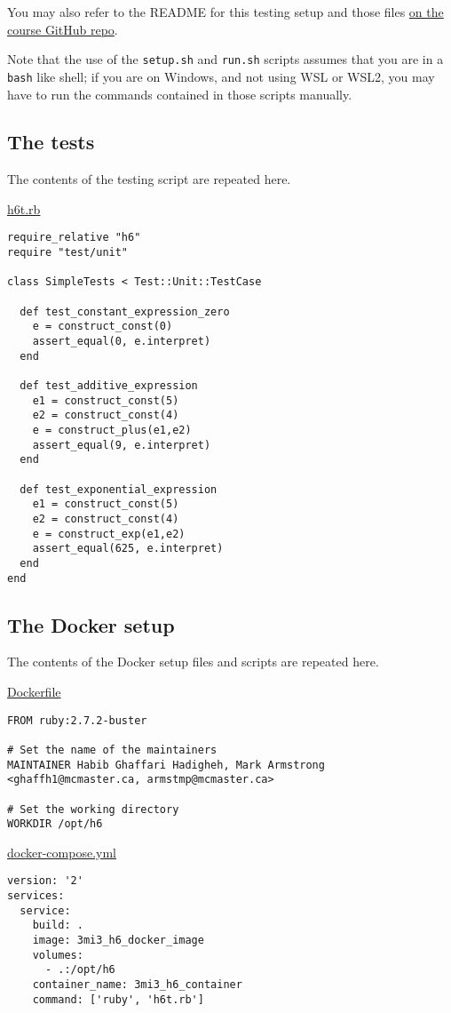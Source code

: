 \documentclass[11pt]{article}
\begin{document}
You may also refer to the README
for this testing setup and those files
\href{https://github.com/armkeh/principles-of-programming-languages/tree/master/homework/testing/h5}{on the course GitHub repo}.

Note that the use of the \texttt{setup.sh} and \texttt{run.sh} scripts assumes
that you are in a \texttt{bash} like shell; if you are on Windows,
and not using WSL or WSL2, you may have
to run the commands contained in those scripts manually.

\subsection*{The tests}
\label{sec:org9e3ae21}
The contents of the testing script are repeated here.

\href{./testing/h6/h6t.rb}{h6t.rb}
\begin{verbatim}
require_relative "h6"
require "test/unit"

class SimpleTests < Test::Unit::TestCase

  def test_constant_expression_zero
    e = construct_const(0)
    assert_equal(0, e.interpret)
  end

  def test_additive_expression
    e1 = construct_const(5)
    e2 = construct_const(4)
    e = construct_plus(e1,e2)
    assert_equal(9, e.interpret)
  end

  def test_exponential_expression
    e1 = construct_const(5)
    e2 = construct_const(4)
    e = construct_exp(e1,e2)
    assert_equal(625, e.interpret)
  end
end
\end{verbatim}

\subsection*{The Docker setup}
\label{sec:orgb65ea2b}
The contents of the Docker setup files and scripts are repeated here.

\href{./testing/h5/Dockerfile}{Dockerfile}
\begin{verbatim}
FROM ruby:2.7.2-buster

# Set the name of the maintainers
MAINTAINER Habib Ghaffari Hadigheh, Mark Armstrong <ghaffh1@mcmaster.ca, armstmp@mcmaster.ca>

# Set the working directory
WORKDIR /opt/h6
\end{verbatim}

\href{./testing/h5/docker-compose.yml}{docker-compose.yml}
\begin{verbatim}
version: '2'
services:
  service:
    build: .
    image: 3mi3_h6_docker_image
    volumes:
      - .:/opt/h6
    container_name: 3mi3_h6_container
    command: ['ruby', 'h6t.rb']
\end{verbatim}
\end{document}

